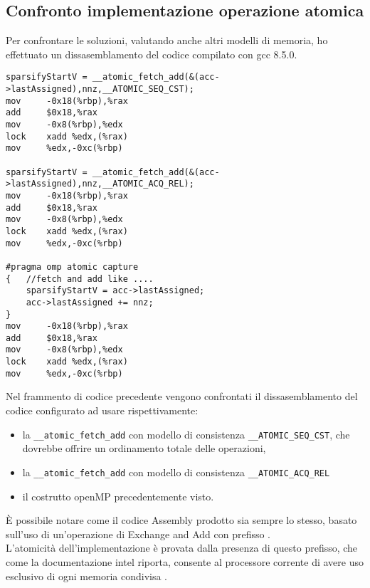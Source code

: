 \subsection{Confronto implementazione operazione atomica}
Per confrontare le soluzioni, valutando anche altri modelli di memoria,
ho effettuato un dissasemblamento del codice compilato con gcc 8.5.0.\\
\begin{lstlisting}[language={[x86masm]Assembler}]
sparsifyStartV = __atomic_fetch_add(&(acc->lastAssigned),nnz,__ATOMIC_SEQ_CST); 
mov		-0x18(%rbp),%rax
add		$0x18,%rax
mov		-0x8(%rbp),%edx
lock 	xadd %edx,(%rax)
mov		%edx,-0xc(%rbp)

sparsifyStartV = __atomic_fetch_add(&(acc->lastAssigned),nnz,__ATOMIC_ACQ_REL); 
mov		-0x18(%rbp),%rax
add		$0x18,%rax
mov		-0x8(%rbp),%edx
lock	xadd %edx,(%rax)
mov		%edx,-0xc(%rbp)

#pragma omp atomic capture
{   //fetch and add like .... 
	sparsifyStartV = acc->lastAssigned;
	acc->lastAssigned += nnz;
}
mov		-0x18(%rbp),%rax
add		$0x18,%rax
mov		-0x8(%rbp),%edx
lock	xadd %edx,(%rax)
mov		%edx,-0xc(%rbp) 
\end{lstlisting}
Nel frammento di codice precedente vengono confrontati il dissasemblamento del codice
configurato ad usare rispettivamente: 
\begin{itemize}
	\item la \verb|__atomic_fetch_add| con modello di consistenza \verb|__ATOMIC_SEQ_CST|, 
	  che dovrebbe offrire un ordinamento totale delle operazioni,
	\item la \verb|__atomic_fetch_add| con modello di consistenza \verb|__ATOMIC_ACQ_REL|
	\item il costrutto openMP  precedentemente visto.\\
\end{itemize}
È possibile notare come il codice Assembly prodotto sia sempre lo stesso,
basato sull'uso di un'operazione di Exchange and Add con prefisso .\\
L'atomicità dell'implementazione è provata dalla presenza di questo prefisso,
che come la documentazione intel riporta, 
consente al processore corrente di avere uso esclusivo di ogni memoria condivisa .\\


